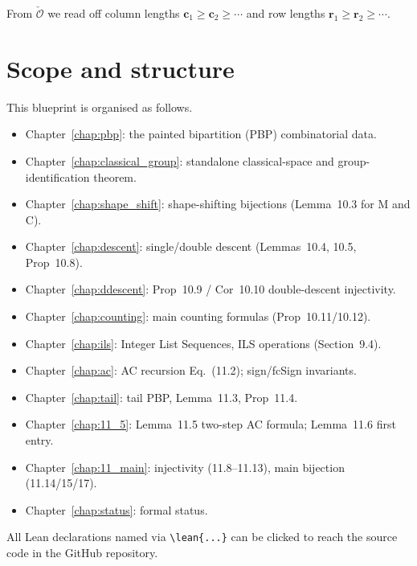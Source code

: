 From $\check{\mathcal{O}}$ we read off column lengths
$\mathbf{c}_1 \geq \mathbf{c}_2 \geq \cdots$ and row lengths
$\mathbf{r}_1 \geq \mathbf{r}_2 \geq \cdots$.

\section{Scope and structure}

This blueprint is organised as follows.

\begin{itemize}
\item Chapter~\ref{chap:pbp}: the painted bipartition (PBP) combinatorial data.
\item Chapter~\ref{chap:classical_group}: standalone classical-space and
      group-identification theorem.
\item Chapter~\ref{chap:shape_shift}: shape-shifting bijections (Lemma~10.3 for M and C).
\item Chapter~\ref{chap:descent}: single/double descent (Lemmas~10.4, 10.5, Prop~10.8).
\item Chapter~\ref{chap:ddescent}: Prop~10.9 / Cor~10.10 double-descent injectivity.
\item Chapter~\ref{chap:counting}: main counting formulas (Prop~10.11/10.12).
\item Chapter~\ref{chap:ils}: Integer List Sequences, ILS operations (Section~9.4).
\item Chapter~\ref{chap:ac}: AC recursion Eq.~(11.2); sign/fcSign invariants.
\item Chapter~\ref{chap:tail}: tail PBP, Lemma~11.3, Prop~11.4.
\item Chapter~\ref{chap:11_5}: Lemma~11.5 two-step AC formula; Lemma~11.6 first entry.
\item Chapter~\ref{chap:11_main}: injectivity (11.8--11.13), main bijection (11.14/15/17).
\item Chapter~\ref{chap:status}: formal status.
\end{itemize}

All Lean declarations named via \texttt{\textbackslash lean\{...\}} can be
clicked to reach the source code in the GitHub repository.
